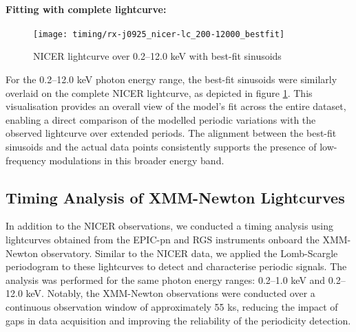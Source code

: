				\paragraph{Fitting with complete lightcurve:}
				\begin{figure}[h!]
					\centering
					\texttt{[image: timing/rx-j0925\_nicer-lc\_200-12000\_bestfit]}
					\caption{NICER lightcurve over 0.2--12.0 keV with best-fit sinusoids}
					\label{result:lc-mrvel-nicer:200-12000-bestfit}
				\end{figure}
				For the 0.2--12.0 keV photon energy range, the best-fit sinusoids were similarly overlaid on the complete NICER lightcurve, as depicted in figure \ref{result:lc-mrvel-nicer:200-12000-bestfit}. This visualisation provides an overall view of the model's fit across the entire dataset, enabling a direct comparison of the modelled periodic variations with the observed lightcurve over extended periods. The alignment between the best-fit sinusoids and the actual data points consistently supports the presence of low-frequency modulations in this broader energy band.
				
				
		\subsection{Timing Analysis of XMM-Newton Lightcurves}
			In addition to the NICER observations, we conducted a timing analysis using lightcurves obtained from the EPIC-pn and RGS instruments onboard the XMM-Newton observatory. Similar to the NICER data, we applied the Lomb-Scargle periodogram to these lightcurves to detect and characterise periodic signals. The analysis was performed for the same photon energy ranges: 0.2--1.0 keV and 0.2--12.0 keV. Notably, the XMM-Newton observations were conducted over a continuous observation window of approximately 55 ks, reducing the impact of gaps in data acquisition and improving the reliability of the periodicity detection.
			
